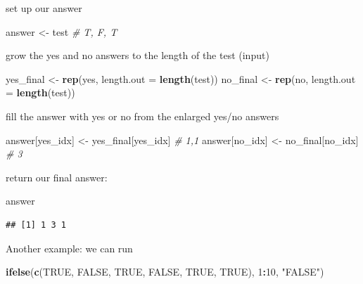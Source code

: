 \documentclass[]{book}
\newenvironment{Shaded}{\begin{snugshade}}{\end{snugshade}}
\newcommand{\CommentTok}[1]{\textcolor[rgb]{0.56,0.35,0.01}{\textit{#1}}}
\newcommand{\DataTypeTok}[1]{\textcolor[rgb]{0.13,0.29,0.53}{#1}}
\newcommand{\DecValTok}[1]{\textcolor[rgb]{0.00,0.00,0.81}{#1}}
\newcommand{\KeywordTok}[1]{\textcolor[rgb]{0.13,0.29,0.53}{\textbf{#1}}}
\newcommand{\NormalTok}[1]{#1}
\newcommand{\OperatorTok}[1]{\textcolor[rgb]{0.81,0.36,0.00}{\textbf{#1}}}
\newcommand{\OtherTok}[1]{\textcolor[rgb]{0.56,0.35,0.01}{#1}}
\newcommand{\StringTok}[1]{\textcolor[rgb]{0.31,0.60,0.02}{#1}}
\begin{document}
set up our answer

\begin{Shaded}
\begin{Highlighting}[]
\NormalTok{answer <-}\StringTok{ }\NormalTok{test }\CommentTok{# T, F, T}
\end{Highlighting}
\end{Shaded}

grow the yes and no answers to the length of the test (input)

\begin{Shaded}
\begin{Highlighting}[]
\NormalTok{yes_final <-}\StringTok{ }\KeywordTok{rep}\NormalTok{(yes, }\DataTypeTok{length.out =} \KeywordTok{length}\NormalTok{(test))}
\NormalTok{no_final <-}\StringTok{ }\KeywordTok{rep}\NormalTok{(no, }\DataTypeTok{length.out =} \KeywordTok{length}\NormalTok{(test))}
\end{Highlighting}
\end{Shaded}

fill the answer with yes or no from the enlarged yes/no answers

\begin{Shaded}
\begin{Highlighting}[]
\NormalTok{answer[yes_idx] <-}\StringTok{ }\NormalTok{yes_final[yes_idx]  }\CommentTok{# 1,1}
\NormalTok{answer[no_idx] <-}\StringTok{ }\NormalTok{no_final[no_idx]     }\CommentTok{# 3}
\end{Highlighting}
\end{Shaded}

return our final answer:

\begin{Shaded}
\begin{Highlighting}[]
\NormalTok{answer}
\end{Highlighting}
\end{Shaded}

\begin{verbatim}
## [1] 1 3 1
\end{verbatim}

Another example: we can run

\begin{Shaded}
\begin{Highlighting}[]
\KeywordTok{ifelse}\NormalTok{(}\KeywordTok{c}\NormalTok{(}\OtherTok{TRUE}\NormalTok{, }\OtherTok{FALSE}\NormalTok{, }\OtherTok{TRUE}\NormalTok{, }\OtherTok{FALSE}\NormalTok{, }\OtherTok{TRUE}\NormalTok{, }\OtherTok{TRUE}\NormalTok{), }\DecValTok{1}\OperatorTok{:}\DecValTok{10}\NormalTok{, }\StringTok{"FALSE"}\NormalTok{)}
\end{Highlighting}
\end{Shaded}
\end{document}
